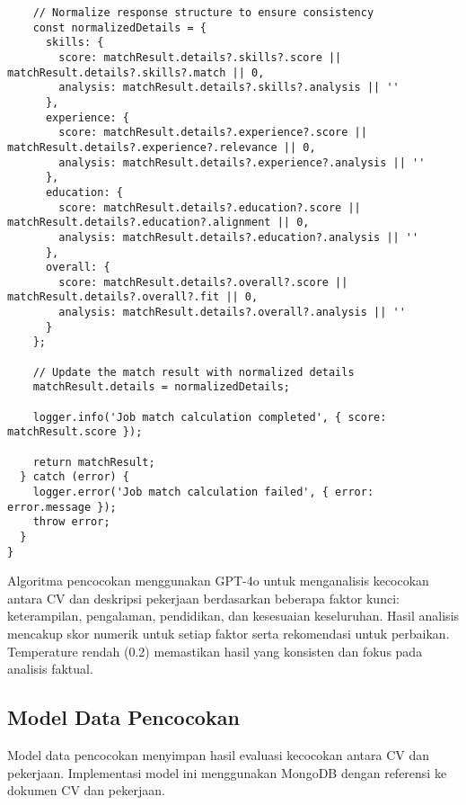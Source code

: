 \begin{verbatim}
    // Normalize response structure to ensure consistency
    const normalizedDetails = {
      skills: {
        score: matchResult.details?.skills?.score || matchResult.details?.skills?.match || 0,
        analysis: matchResult.details?.skills?.analysis || ''
      },
      experience: {
        score: matchResult.details?.experience?.score || matchResult.details?.experience?.relevance || 0,
        analysis: matchResult.details?.experience?.analysis || ''
      },
      education: {
        score: matchResult.details?.education?.score || matchResult.details?.education?.alignment || 0,
        analysis: matchResult.details?.education?.analysis || ''
      },
      overall: {
        score: matchResult.details?.overall?.score || matchResult.details?.overall?.fit || 0,
        analysis: matchResult.details?.overall?.analysis || ''
      }
    };
    
    // Update the match result with normalized details
    matchResult.details = normalizedDetails;
    
    logger.info('Job match calculation completed', { score: matchResult.score });
    
    return matchResult;
  } catch (error) {
    logger.error('Job match calculation failed', { error: error.message });
    throw error;
  }
}
\end{verbatim}

Algoritma pencocokan menggunakan GPT-4o untuk menganalisis kecocokan antara CV dan deskripsi pekerjaan berdasarkan beberapa faktor kunci: keterampilan, pengalaman, pendidikan, dan kesesuaian keseluruhan. Hasil analisis mencakup skor numerik untuk setiap faktor serta rekomendasi untuk perbaikan. Temperature rendah (0.2) memastikan hasil yang konsisten dan fokus pada analisis faktual.

\subsection{Model Data Pencocokan}
Model data pencocokan menyimpan hasil evaluasi kecocokan antara CV dan pekerjaan. Implementasi model ini menggunakan MongoDB dengan referensi ke dokumen CV dan pekerjaan.

